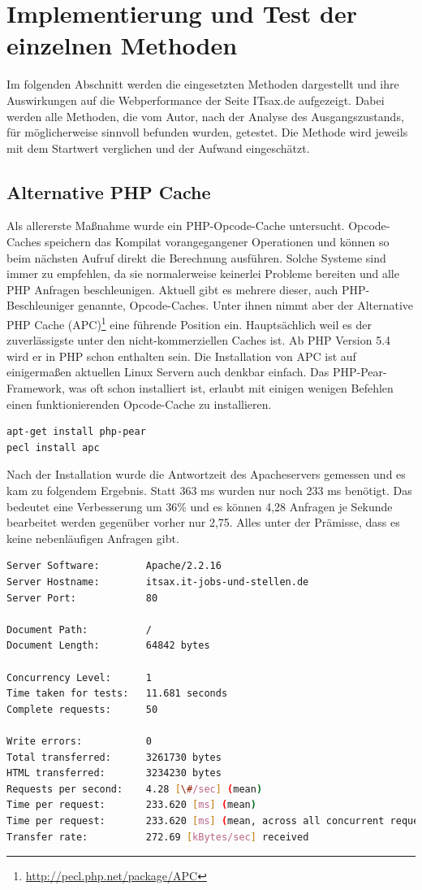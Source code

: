 \section{Implementierung und Test der einzelnen Methoden}
Im folgenden Abschnitt werden die eingesetzten Methoden dargestellt und ihre Auswirkungen auf die Webperformance der Seite ITsax.de aufgezeigt. 
Dabei werden alle Methoden, die vom Autor, nach der Analyse des Ausgangszustands, für möglicherweise sinnvoll befunden wurden, getestet. Die Methode wird jeweils mit dem Startwert verglichen und der Aufwand eingeschätzt.
\subsection{Alternative PHP Cache} Als allererste Maßnahme wurde ein PHP-Opcode-Cache untersucht. Opcode-Caches speichern das Kompilat vorangegangener Operationen und können so beim nächsten Aufruf direkt die Berechnung ausf\"uhren. Solche Systeme sind immer zu empfehlen, da sie normalerweise keinerlei Probleme bereiten und alle PHP Anfragen beschleunigen. Aktuell gibt es mehrere dieser, auch PHP-Beschleuniger genannte, Opcode-Caches. Unter ihnen nimmt aber der Alternative PHP Cache (APC)\footnote{\url{http://pecl.php.net/package/APC}} eine führende Position ein. Hauptsächlich weil es der zuverlässigste unter den nicht-kommerziellen Caches ist. Ab PHP Version 5.4 wird er in PHP schon enthalten sein.
Die Installation von APC ist auf einigermaßen aktuellen Linux Servern auch denkbar einfach. Das PHP-Pear-Framework, was oft schon installiert ist, erlaubt mit einigen wenigen Befehlen einen funktionierenden Opcode-Cache zu installieren. 
\begin{lstlisting}[language=bash,label=Installation von APC,caption=Installation von APC]
apt-get install php-pear
pecl install apc
\end{lstlisting}
Nach der Installation wurde die Antwortzeit des Apacheservers gemessen und es kam zu folgendem Ergebnis. Statt 363 ms wurden nur noch 233 ms benötigt. Das bedeutet eine Verbesserung um 36\% und es können 4,28 Anfragen je Sekunde bearbeitet werden gegenüber vorher nur 2,75. Alles unter der Prämisse, dass es keine nebenl\"aufigen Anfragen gibt.

\begin{minipage}[t]{1\textwidth} 
\begin{lstlisting}[language=bash,label=APC gemessen mit ab,caption=APC gemessen mit ab]
Server Software:        Apache/2.2.16
Server Hostname:        itsax.it-jobs-und-stellen.de
Server Port:            80

Document Path:          /
Document Length:        64842 bytes

Concurrency Level:      1
Time taken for tests:   11.681 seconds
Complete requests:      50

Write errors:           0
Total transferred:      3261730 bytes
HTML transferred:       3234230 bytes
Requests per second:    4.28 [\#/sec] (mean)
Time per request:       233.620 [ms] (mean)
Time per request:       233.620 [ms] (mean, across all concurrent requests)
Transfer rate:          272.69 [kBytes/sec] received
\end{lstlisting}
\end{minipage}

